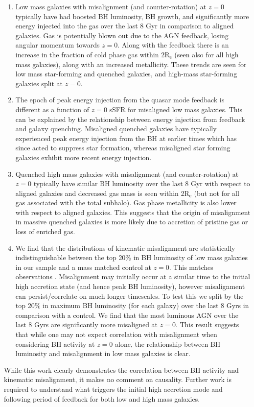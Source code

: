 \begin{enumerate}
    \item Low mass galaxies with misalignment (and counter-rotation) at $z=0$ typically have had boosted BH luminosity, BH growth, and significantly more energy injected into the gas over the last 8 Gyr in comparison to aligned galaxies. Gas is potentially blown out due to the AGN feedback, losing angular momentum towards $z=0$. Along with the feedback there is an increase in the fraction of cold phase gas within 2$\mathrm{R_{e}}$ (seen also for all high mass galaxies), along with an increased metallicity. These trends are seen for low mass star-forming and quenched galaxies, and high-mass star-forming galaxies split at $z=0$.
    
    \item The epoch of peak energy injection from the quasar mode feedback is different as a function of $z=0$ sSFR for misaligned low mass galaxies. This can be explained by the relationship between energy injection from feedback and galaxy quenching. Misaligned quenched galaxies have typically experienced peak energy injection from the BH at earlier times which has since acted to suppress star formation, whereas misaligned star forming galaxies exhibit more recent energy injection.

    \item Quenched high mass galaxies with misalignment (and counter-rotation) at $z=0$ typically have similar BH luminosity over the last 8 Gyr with respect to aligned galaxies and decreased gas mass is  seen within 2$\mathrm{R_{e}}$ (but not for all gas associated with the total subhalo). Gas phase metallicity is also lower with respect to aligned galaxies. This suggests that the origin of misalignment in massive quenched galaxies is more likely due to accretion of pristine gas or loss of enriched gas. 
    
    \item We find that the distributions of kinematic misalignment are statistically indistinguishable between the top 20\% in BH luminosity of low mass galaxies in our sample and a mass matched control at $z=0$. This matches observations \citep[see Figure 6 in][]{ilha2019}. Misalignment may initially occur at a similar time to the initial high accretion state (and hence peak BH luminosity), however misalignment can persist/correlate on much longer timescales. To test this we split by the top 20\% in maximum BH luminosity (for each galaxy) over the last 8 Gyrs in comparison with a control. We find that the most luminous AGN over the last 8 Gyrs are significantly more misaligned at $z=0$. This result suggests that while one may not expect correlation with misalignment when considering BH activity at $z=0$ alone, the relationship between BH luminosity and misalignment in low mass galaxies is clear. 
\end{enumerate}
While this work clearly demonstrates the correlation between BH activity and kinematic misalignment, it makes no comment on causality. Further work is required to understand what triggers the initial high accretion mode and following period of feedback for both low and high mass galaxies.
